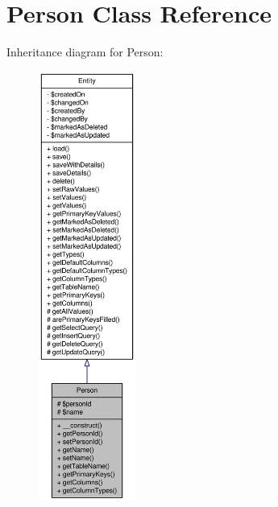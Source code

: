 \hypertarget{classPerson}{
\section{Person Class Reference}
\label{classPerson}
}


Inheritance diagram for Person:\nopagebreak
\begin{figure}[H]
\begin{center}
\leavevmode
\includegraphics[height=400pt]{classPerson__inherit__graph}
\end{center}
\end{figure}


